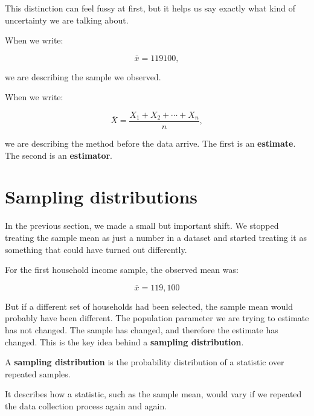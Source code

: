 \documentclass[
  letterpaper,
  DIV=11,
  numbers=noendperiod]{scrreprt}
\begin{document}
This distinction can feel fussy at first, but it helps us say exactly
what kind of uncertainty we are talking about.

When we write:

\[
\bar{x} = 119100,
\]

we are describing the sample we observed.

When we write:

\[
\bar{X}
=
\frac{X_1 + X_2 + \cdots + X_n}{n},
\]

we are describing the method before the data arrive. The first is an
\textbf{estimate}. The second is an \textbf{estimator}.

\section{Sampling distributions}\label{sampling-distributions}

In the previous section, we made a small but important shift. We stopped
treating the sample mean as just a number in a dataset and started
treating it as something that could have turned out differently.

For the first household income sample, the observed mean was:

\[
\bar{x} = 119{,}100
\]

But if a different set of households had been selected, the sample mean
would probably have been different. The population parameter we are
trying to estimate has not changed. The sample has changed, and
therefore the estimate has changed. This is the key idea behind a
\textbf{sampling distribution}.

\begin{tcolorbox}[enhanced jigsaw, arc=.35mm, bottomrule=.15mm, bottomtitle=1mm, breakable, colback=white, colbacktitle=quarto-callout-note-color!10!white, colframe=quarto-callout-note-color-frame, coltitle=black, left=2mm, leftrule=.75mm, opacityback=0, opacitybacktitle=0.6, rightrule=.15mm, title=\textcolor{quarto-callout-note-color}{\faInfo}\hspace{0.5em}{Terminology: sampling distribution}, titlerule=0mm, toprule=.15mm, toptitle=1mm]

A \textbf{sampling distribution} is the probability distribution of a
statistic over repeated samples.

It describes how a statistic, such as the sample mean, would vary if we
repeated the data collection process again and again.

\end{tcolorbox}
\end{document}
